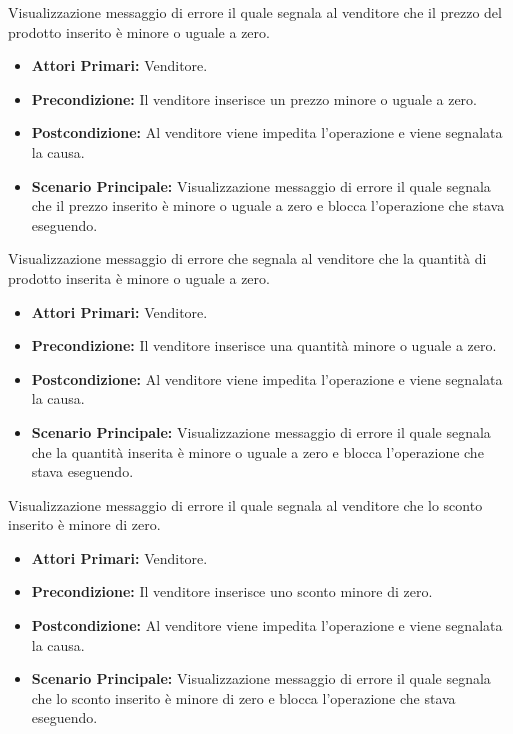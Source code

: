 Visualizzazione messaggio di errore il quale segnala al venditore che il prezzo del prodotto inserito è minore o uguale a zero.
\begin{itemize}
    \item \textbf{Attori Primari:} Venditore.
    \item \textbf{Precondizione:} Il venditore inserisce un prezzo minore o uguale a zero.
    \item \textbf{Postcondizione:} Al venditore viene impedita l'operazione e viene segnalata la causa.
    \item \textbf{Scenario Principale:} Visualizzazione messaggio di errore il quale segnala che il prezzo inserito è minore o uguale a zero e blocca l'operazione che stava eseguendo.
\end{itemize}

Visualizzazione messaggio di errore che segnala al venditore che la quantità di prodotto inserita è minore o uguale a zero.
\begin{itemize}
    \item \textbf{Attori Primari:} Venditore.
    \item \textbf{Precondizione:} Il venditore inserisce una quantità minore o uguale a zero.
    \item \textbf{Postcondizione:} Al venditore viene impedita l'operazione e viene segnalata la causa.
    \item \textbf{Scenario Principale:} Visualizzazione messaggio di errore il quale segnala che la quantità inserita è minore o uguale a zero e blocca l'operazione che stava eseguendo.
\end{itemize}

Visualizzazione messaggio di errore il quale segnala al venditore che lo sconto inserito è minore di zero.
\begin{itemize}
    \item \textbf{Attori Primari:} Venditore.
    \item \textbf{Precondizione:} Il venditore inserisce uno sconto minore di zero.
    \item \textbf{Postcondizione:} Al venditore viene impedita l'operazione e viene segnalata la causa.
    \item \textbf{Scenario Principale:} Visualizzazione messaggio di errore il quale segnala che lo sconto inserito è minore di zero e blocca l'operazione che stava eseguendo.
\end{itemize}

